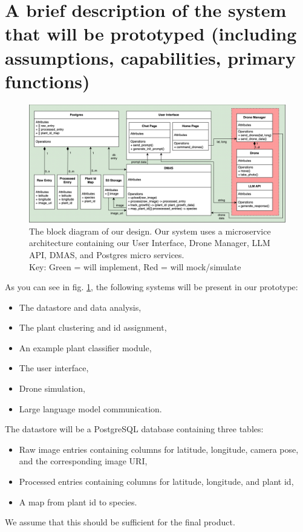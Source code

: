 \documentclass{article}
\begin{document}
\section{A brief description of the system that will be prototyped (including assumptions, capabilities, primary functions)}

\begin{figure}[htbp]
    \includegraphics[width=\textwidth]{block_diagram}
    \caption{The block diagram of our design. Our system uses a microservice architecture containing our User Interface, Drone Manager, LLM API, DMAS, and Postgres micro services. \\ 
    Key: Green = will implement, Red = will mock/simulate}
    \label{fig:design}
\end{figure}


As you can see in fig. \ref{fig:design}, the following systems will be present in our prototype:
\begin{itemize}[noitemsep,topsep=3pt]
\item The datastore and data analysis,
\item The plant clustering and id assignment,
\item An example plant classifier module,
\item The user interface,
\item Drone simulation,
\item Large language model communication.
\end{itemize}

\noindent
The datastore will be a PostgreSQL database containing three tables:
\begin{itemize}[noitemsep,topsep=3pt]
\item Raw image entries containing columns for latitude, longitude, camera pose, and the corresponding image URI,
\item Processed entries containing columns for latitude, longitude, and plant id,
\item A map from plant id to species. 
\end{itemize}
We assume that this should be sufficient for the final product.
\end{document}
